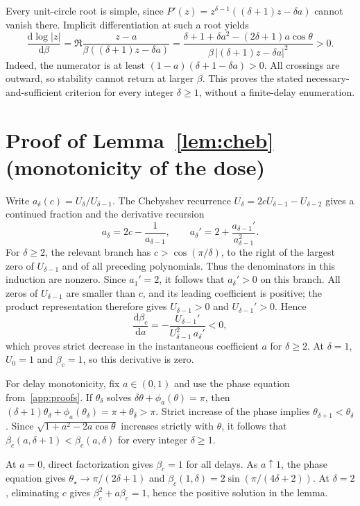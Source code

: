 \documentclass[11pt]{article}
\theoremstyle{definition}
\begin{document}
Every unit-circle root is simple, since
$P'(z)=z^{\delta-1}((\delta+1)z-\delta a)$ cannot vanish there. Implicit differentiation at such
a root yields
\[
 \frac{\mathrm d\log|z|}{\mathrm d\beta}
 =\Re\frac{z-a}{\beta((\delta+1)z-\delta a)}
 =\frac{\delta+1+\delta a^2-(2\delta+1)a\cos\theta}
 {\beta\,| (\delta+1)z-\delta a |^2}>0.
\]
Indeed, the numerator is at least $(1-a)(\delta+1-\delta a)>0$. All crossings are outward,
so stability cannot return at larger $\beta$. This proves the stated necessary-and-sufficient
criterion for every integer $\delta\ge1$, without a finite-delay enumeration.

\section{Proof of Lemma~\ref{lem:cheb} (monotonicity of the dose)}\label{app:cheb}
Write $a_\delta(c)=U_\delta/U_{\delta-1}$. The Chebyshev recurrence $U_\delta=2cU_{\delta-1}-U_{\delta-2}$
gives a continued fraction and the derivative recursion
\[
  a_\delta=2c-\frac{1}{a_{\delta-1}},
  \qquad
  a_\delta'=2+\frac{a_{\delta-1}'}{a_{\delta-1}^2} .
\]
For $\delta\ge2$, the relevant branch has $c>\cos(\pi/\delta)$, to the right of the largest
zero of $U_{\delta-1}$ and of all preceding polynomials. Thus the denominators in this induction
are nonzero. Since $a_1'=2$, it follows that $a_\delta'>0$ on this branch.
All zeros of $U_{\delta-1}$ are smaller than $c$, and its leading coefficient is positive; the
product representation therefore gives $U_{\delta-1}>0$ and $U_{\delta-1}'>0$. Hence
\[
  \frac{\mathrm d\beta_c}{\mathrm da}=-\frac{U_{\delta-1}'}{U_{\delta-1}^2\,a_\delta'}<0 ,
\]
which proves strict decrease in the instantaneous coefficient $a$ for $\delta\ge2$.
At $\delta=1$, $U_0=1$ and $\beta_c=1$, so this derivative is zero.

For delay monotonicity, fix $a\in(0,1)$ and use the phase equation from~\ref{app:proofs}.
If $\theta_\delta$ solves $\delta\theta+\phi_a(\theta)=\pi$, then
$(\delta+1)\theta_\delta+\phi_a(\theta_\delta)=\pi+\theta_\delta>\pi$.
Strict increase of the phase implies $\theta_{\delta+1}<\theta_\delta$.
Since $\sqrt{1+a^2-2a\cos\theta}$ increases strictly with $\theta$, it follows that
$\beta_c(a,\delta+1)<\beta_c(a,\delta)$ for every integer $\delta\ge1$.

At $a=0$, direct factorization gives $\beta_c=1$ for all delays. As $a\uparrow1$, the phase equation
gives $\theta_\star\to\pi/(2\delta+1)$ and
$\beta_c(1,\delta)=2\sin(\pi/(4\delta+2))$. At $\delta=2$, eliminating $c$ gives
$\beta_c^2+a\beta_c=1$, hence the positive solution in the lemma.
\end{document}
